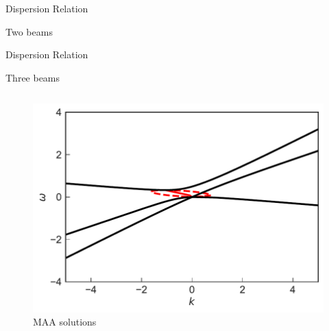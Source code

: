 \documentclass[9pt]{beamer}
\begin{document}
\begin{darkframes}
\begin{frame}{Dispersion Relation}
\begin{figure}
\end{figure}





\begin{tcolorbox}
   \centering
   Two beams
\end{tcolorbox}

\end{frame}

\begin{frame}{Dispersion Relation}

\centering
      Three beams

   \begin{columns}[T]

\begin{column}{0.5\textwidth}
   \begin{figure}
     \includegraphics[width=\linewidth]{assets/dr/spectDB3WC4DRDBMAAPltBlob.pdf}
     \caption*{MAA solutions}
  \end{figure}
\end{column}


\end{columns}
\end{frame}
\end{darkframes}
\end{document}
